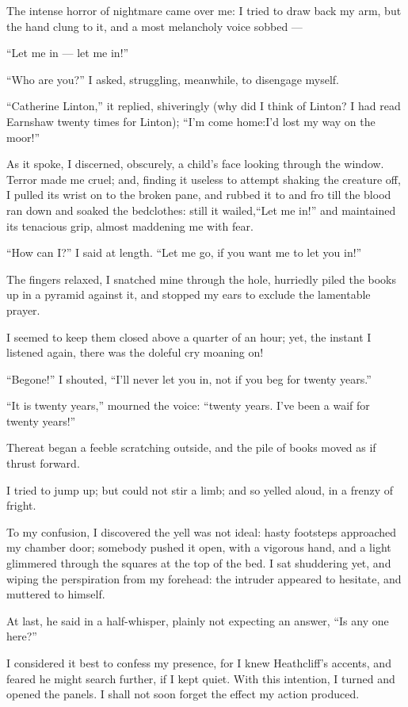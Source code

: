 \par The intense horror of nightmare came over me: I tried to draw back my arm, but the hand clung to it, and a most melancholy voice sobbed —
\par “Let me in — let me in!”
\par “Who are you?” I asked, struggling, meanwhile, to disengage myself.
\par “Catherine Linton,” it replied, shiveringly (why did I think of Linton? I had read Earnshaw twenty times for Linton); “I'm come home:I'd lost my way on the moor!”
\par As it spoke, I discerned, obscurely, a child's face looking through the window. Terror made me cruel; and, finding it useless to attempt shaking the creature off, I pulled its wrist on to the broken pane, and rubbed it to and fro till the blood ran down and soaked the bedclothes: still it wailed,“Let me in!” and maintained its tenacious grip, almost maddening me with fear.
\par “How can I?” I said at length. “Let me go, if you want me to let you in!”
\par The fingers relaxed, I snatched mine through the hole, hurriedly piled the books up in a pyramid against it, and stopped my ears to exclude the lamentable prayer.
\par I seemed to keep them closed above a quarter of an hour; yet, the instant I listened again, there was the doleful cry moaning on!
\par “Begone!” I shouted, “I'll never let you in, not if you beg for twenty years.”
\par “It is twenty years,” mourned the voice: “twenty years. I've been a waif for twenty years!”
\par Thereat began a feeble scratching outside, and the pile of books moved as if thrust forward.
\par I tried to jump up; but could not stir a limb; and so yelled aloud, in a frenzy of fright.
\par To my confusion, I discovered the yell was not ideal: hasty footsteps approached my chamber door; somebody pushed it open, with a vigorous hand, and a light glimmered through the squares at the top of the bed. I sat shuddering yet, and wiping the perspiration from my forehead: the intruder appeared to hesitate, and muttered to himself.
\par At last, he said in a half-whisper, plainly not expecting an answer, “Is any one here?”
\par I considered it best to confess my presence, for I knew Heathcliff's accents, and feared he might search further, if I kept quiet. With this intention, I turned and opened the panels. I shall not soon forget the effect my action produced.

